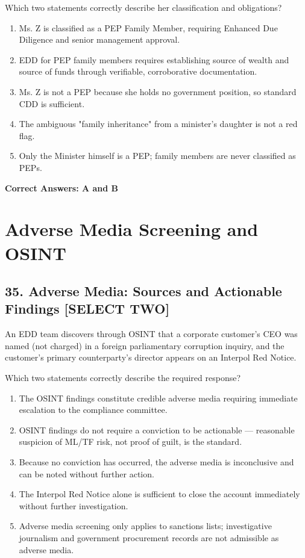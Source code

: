 \documentclass[11pt,a4paper]{article}
\begin{document}
	Which two statements correctly describe her classification and obligations?
	
	\begin{enumerate}[label=\Alph*.]
		\item Ms. Z is classified as a PEP Family Member, requiring Enhanced Due Diligence and senior management approval.
		\item EDD for PEP family members requires establishing source of wealth and source of funds through verifiable, corroborative documentation.
		\item Ms. Z is not a PEP because she holds no government position, so standard CDD is sufficient.
		\item The ambiguous "family inheritance" from a minister's daughter is not a red flag.
		\item Only the Minister himself is a PEP; family members are never classified as PEPs.
	\end{enumerate}
	
	\textbf{Correct Answers: A and B}
	
	\section{Adverse Media Screening and OSINT}
	
	\subsection{35. Adverse Media: Sources and Actionable Findings \textnormal{[SELECT TWO]}}
	
	An EDD team discovers through OSINT that a corporate customer's CEO was named (not charged) in a foreign parliamentary corruption inquiry, and the customer's primary counterparty's director appears on an Interpol Red Notice.
	
	Which two statements correctly describe the required response?
	
	\begin{enumerate}[label=\Alph*.]
		\item The OSINT findings constitute credible adverse media requiring immediate escalation to the compliance committee.
		\item OSINT findings do not require a conviction to be actionable — reasonable suspicion of ML/TF risk, not proof of guilt, is the standard.
		\item Because no conviction has occurred, the adverse media is inconclusive and can be noted without further action.
		\item The Interpol Red Notice alone is sufficient to close the account immediately without further investigation.
		\item Adverse media screening only applies to sanctions lists; investigative journalism and government procurement records are not admissible as adverse media.
	\end{enumerate}
	
\end{document}
